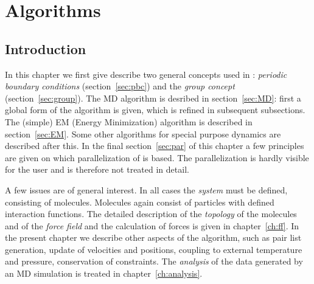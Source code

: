 \newcommand{\nproc}{\mbox{$M$}}
\newcommand{\natom}{\mbox{$N$}}
\newcommand{\nx}{\mbox{$n_x$}}
\newcommand{\ny}{\mbox{$n_y$}}
\newcommand{\nz}{\mbox{$n_z$}}
\newcommand{\nsgrid}{NS grid}
\newcommand{\fftgrid}{FFT grid}
\newcommand{\dgrid}{\mbox{$\delta_{grid}$}}
\chapter{Algorithms}
\label{ch:algorithms}
\section{Introduction}
In this chapter we first give describe two general concepts used in
\gromacs:  {\em periodic boundary conditions} (section~\ref{sec:pbc})
and  the {\em group concept} (section~\ref{sec:group}). The MD algorithm
is desribed in section~\ref{sec:MD}: first a global form of the
algorithm is given, which is refined in subsequent subsections. The
(simple)  EM (Energy Minimization) algorithm is described in
section~\ref{sec:EM}.
Some other algorithms for special purpose dynamics are described after this.
In the final section~\ref{sec:par} of this chapter a few principles
are  given on which parallelization of {\gromacs} is based. The
parallelization  is hardly visible for the user and is therefore not
treated in detail.

A few issues are of general interest. In all cases the {\em system}
must be defined, consisting of molecules. Molecules again consist of
particles  with defined interaction functions. The detailed
description of the {\em topology} of the molecules and of the {\em force
field} and the calculation of forces is given in
chapter~\ref{ch:ff}. In the present chapter we describe
other aspects of the algorithm, such as pair list generation, update of
velocities  and positions, coupling to external temperature and
pressure,  conservation of constraints. The {\em analysis} of the data
generated by an MD simulation is treated in chapter~\ref{ch:analysis}.


